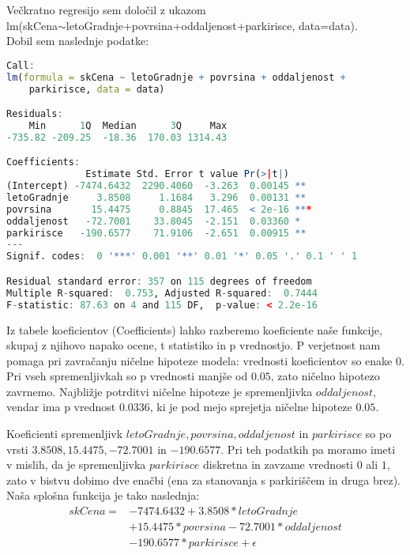 \documentclass[a4paper, 12pt]{article}
\begin{document}
Večkratno regresijo sem določil z ukazom \\
{\sf lm(skCena$\sim$letoGradnje+povrsina+oddaljenost+parkirisce, data=data)}. \\
Dobil sem naslednje podatke:
\newpage
\begin{lstlisting}[language=R,basicstyle=\small,label={lst:1}]
Call:
lm(formula = skCena ~ letoGradnje + povrsina + oddaljenost +
	parkirisce, data = data)

Residuals:
    Min      1Q  Median      3Q     Max 
-735.82 -209.25  -18.36  170.03 1314.43 

Coefficients:
              Estimate Std. Error t value Pr(>|t|)    
(Intercept) -7474.6432  2290.4060  -3.263  0.00145 **
letoGradnje     3.8508     1.1684   3.296  0.00131 **
povrsina       15.4475     0.8845  17.465  < 2e-16 ***
oddaljenost   -72.7001    33.8045  -2.151  0.03360 *
parkirisce   -190.6577    71.9106  -2.651  0.00915 **
---
Signif. codes:  0 '***' 0.001 '**' 0.01 '*' 0.05 '.' 0.1 ' ' 1

Residual standard error: 357 on 115 degrees of freedom
Multiple R-squared:  0.753,	Adjusted R-squared:  0.7444
F-statistic: 87.63 on 4 and 115 DF,  p-value: < 2.2e-16
\end{lstlisting}

Iz tabele koeficientov (Coefficients) lahko razberemo koeficiente naše
funkcije, skupaj z njihovo napako ocene, t statistiko in p vrednostjo. P
verjetnost nam pomaga pri zavračanju ničelne hipoteze modela: vrednosti
koeficientov so enake $ 0 $. Pri vseh spremenljivkah so p vrednosti manjše od
$ 0.05 $, zato ničelno hipotezo zavrnemo. Najbližje potrditvi ničelne hipoteze
je spremenljivka $ oddaljenost $, vendar ima p vrednost $ 0.0336 $, ki je pod
mejo sprejetja ničelne hipoteze $ 0.05 $.

Koeficienti spremenljivk $ letoGradnje, povrsina, oddaljenost $ in
$ parkirisce $ so po vrsti $ 3.8508, 15.4475, -72.7001 $ in $ -190.6577 $. Pri
teh podatkih pa moramo imeti v mislih, da je spremenljivka $ parkirisce $
diskretna in zavzame vrednosti $ 0 $ ali $ 1 $, zato v bistvu dobimo dve
enačbi (ena za stanovanja s parkiriščem in druga brez). Naša splošna funkcija
je tako naslednja:
\begin{equation}
\begin{split}
	skCena = &-7474.6432+3.8508*letoGradnje \\
			&+15.4475*povrsina-72.7001*oddaljenost \\
			&-190.6577*parkirisce+\epsilon
\end{split}
\end{equation}
\end{document}

